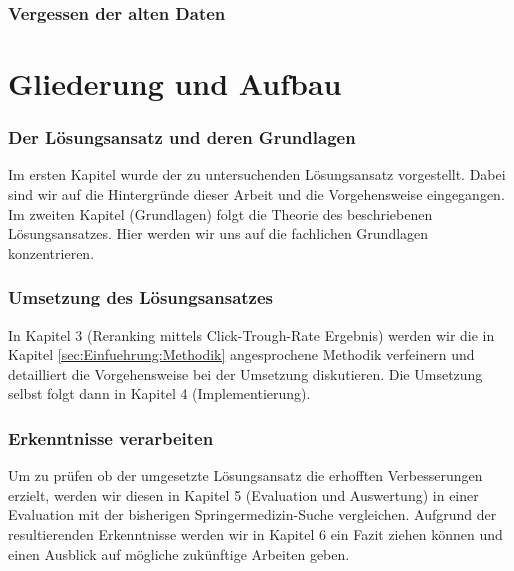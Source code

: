 \subsubsection{Vergessen der alten Daten}
\label{sec:Einfuehrung:Vergessen}


\section{Gliederung und Aufbau}
\label{sec:Einfuehrung:GliederungAufbau}

\subsubsection{Der Lösungsansatz und deren Grundlagen}
\label{sec:Einfuehrung:GliederungAufbau:Loesungsansatz}

Im ersten Kapitel wurde der zu untersuchenden Lösungsansatz vorgestellt. Dabei sind wir auf die Hintergründe dieser Arbeit und die Vorgehensweise eingegangen. Im zweiten Kapitel (Grundlagen) folgt die Theorie des beschriebenen Lösungsansatzes. Hier werden wir uns auf die fachlichen Grundlagen konzentrieren. 

\subsubsection{Umsetzung des Lösungsansatzes}
\label{sec:Einfuehrung:GliederungAufbau:Umsetzung}

In Kapitel 3 (Reranking mittels Click-Trough-Rate Ergebnis) werden wir die in Kapitel \ref{sec:Einfuehrung:Methodik} angesprochene Methodik verfeinern und detailliert die Vorgehensweise bei der Umsetzung diskutieren. Die Umsetzung selbst folgt dann in Kapitel 4 (Implementierung).

\subsubsection{Erkenntnisse verarbeiten}
\label{sec:Einfuehrung:GliederungAufbau:Erkenntnisse}

Um zu prüfen ob der umgesetzte Lösungsansatz die erhofften Verbesserungen erzielt, werden wir diesen in Kapitel 5 (Evaluation und Auswertung) in einer Evaluation mit der bisherigen Springermedizin-Suche vergleichen. Aufgrund der resultierenden Erkenntnisse werden wir in Kapitel 6 ein Fazit ziehen können und einen Ausblick auf mögliche zukünftige Arbeiten geben.